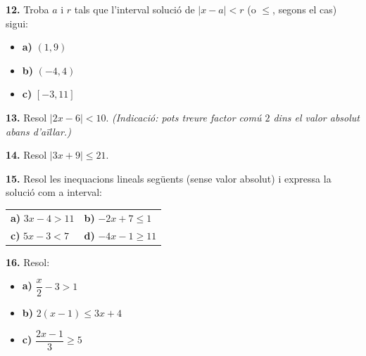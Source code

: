 \documentclass[13pt,a4paper]{extarticle}
\begin{document}
\par\noindent\begin{minipage}{\linewidth}
\textbf{12.} Troba $a$ i $r$ tals que l'interval solució de $|x-a|<r$ (o $\leq$, segons el cas) sigui:\par

\begin{itemize}[leftmargin=0pt,itemsep=3pt,topsep=3pt,parsep=0pt,label={}]
\item \textbf{a)} $\left(1,9\right)$
\item \textbf{b)} $\left(-4,4\right)$
\item \textbf{c)} $\left[-3,11\right]$
\end{itemize}
\end{minipage}\par\vspace{1.6mm}
\par\noindent\begin{minipage}{\linewidth}
\textbf{13.} Resol $|2x-6|<10$. \emph{(Indicació: pots treure factor comú $2$ dins el valor absolut abans d'aïllar.)}\par
\end{minipage}\par\vspace{1.6mm}
\par\noindent\begin{minipage}{\linewidth}
\textbf{14.} Resol $|3x+9|\leq 21$.\par
\end{minipage}\par\vspace{1.6mm}
\par\noindent\begin{minipage}{\linewidth}
\textbf{15.} Resol les inequacions lineals següents (sense valor absolut) i expressa la solució com a interval:\par

\begin{tabular}{@{}p{.46\linewidth}p{.46\linewidth}@{}}
\textbf{a)} $3x-4>11$ & \textbf{b)} $-2x+7\leq 1$ \\[2pt]
\textbf{c)} $5x-3<7$ & \textbf{d)} $-4x-1\geq 11$ \\[2pt]
\end{tabular}\par
\end{minipage}\par\vspace{1.6mm}
\par\noindent\begin{minipage}{\linewidth}
\textbf{16.} Resol:\par

\begin{itemize}[leftmargin=0pt,itemsep=3pt,topsep=3pt,parsep=0pt,label={}]
\item \textbf{a)} $\dfrac{x}{2}-3>1$
\item \textbf{b)} $2\left(x-1\right)\leq 3x+4$
\item \textbf{c)} $\dfrac{2x-1}{3}\geq 5$
\end{itemize}
\end{minipage}\par\vspace{1.6mm}
\end{document}

